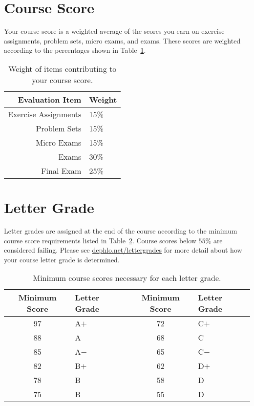 \documentclass[letterpaper,oneside,onecolumn,11pt,article]{memoir}
\begin{document}
\section{Course Score}
Your course score is a weighted average of the scores you earn on exercise assignments, problem sets, micro exams, and exams. These scores are weighted according to the percentages shown in Table~\ref{tab:weights}.
\begin{table}[h]
\caption{\sffamily Weight of items contributing to your course score.}
\label{tab:weights}
\begin{tabular}{r|l} \toprule
\textbf{Evaluation Item} & \textbf{Weight} \\ \hline
Exercise Assignments & 15\% \\
Problem Sets & 15\% \\
Micro Exams & 15\% \\
Exams & 30\% \\
Final Exam & 25\% \\
\bottomrule
\end{tabular}
\end{table}

\section{Letter Grade}
Letter grades are assigned at the end of the course according to the minimum course score requirements listed in Table~\ref{tab:lettergrades}. Course scores below $55\%$ are considered failing. Please see \href{http://dephlo.net/lettergrades}{dephlo.net/lettergrades} for more detail about how your course letter grade is determined. 

\begin{table}[h]
\caption{\sffamily Minimum course scores necessary for each letter grade.}
\label{tab:lettergrades}
\begin{tabular}{cl||cl} \toprule
\textbf{Minimum Score} & \textbf{Letter Grade} & \textbf{Minimum Score} & \textbf{Letter Grade} \\ \hline
97 & \hspace{0.3in}A$+$ & 72 & \hspace{0.3in}C$+$ \\
88 & \hspace{0.3in}A & 68 & \hspace{0.3in}C \\
85 & \hspace{0.3in}A$-$ & 65 & \hspace{0.3in}C$-$ \\
82 & \hspace{0.3in}B$+$ & 62 & \hspace{0.3in}D$+$ \\
78 & \hspace{0.3in}B & 58 & \hspace{0.3in}D \\
75 & \hspace{0.3in}B$-$ & 55 & \hspace{0.3in}D$-$ \\
\bottomrule
\end{tabular}
\end{table}
\end{document}
